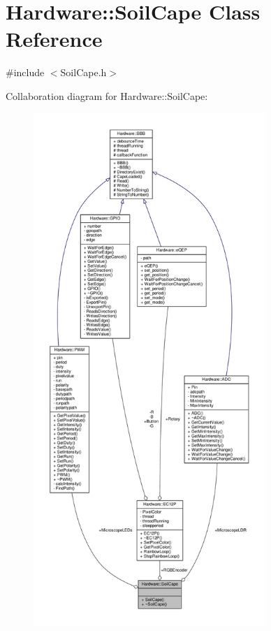 \hypertarget{class_hardware_1_1_soil_cape}{}\section{Hardware\+:\+:Soil\+Cape Class Reference}
\label{class_hardware_1_1_soil_cape}


{\ttfamily \#include $<$Soil\+Cape.\+h$>$}



Collaboration diagram for Hardware\+:\+:Soil\+Cape\+:\nopagebreak
\begin{figure}[H]
\begin{center}
\leavevmode
\includegraphics[height=550pt]{class_hardware_1_1_soil_cape__coll__graph}
\end{center}
\end{figure}
